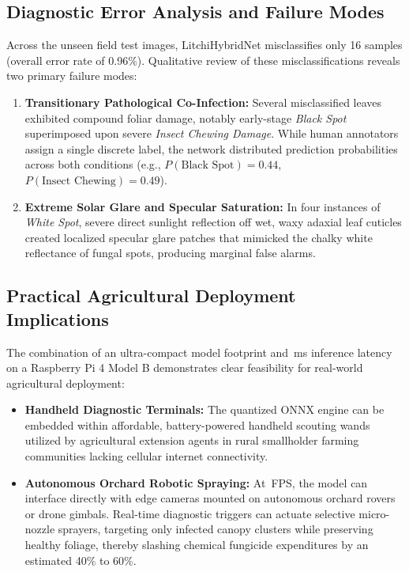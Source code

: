 \subsection{Diagnostic Error Analysis and Failure Modes}
Across the \testEvaluatedSamples{} unseen field test images, LitchiHybridNet misclassifies only 16 samples (overall error rate of 0.96\%). Qualitative review of these misclassifications reveals two primary failure modes:
\begin{enumerate}
    \item \textbf{Transitionary Pathological Co-Infection:} Several misclassified leaves exhibited compound foliar damage, notably early-stage \textit{Black Spot} superimposed upon severe \textit{Insect Chewing Damage}. While human annotators assign a single discrete label, the network distributed prediction probabilities across both conditions (e.g., $P(\text{Black Spot}) = 0.44$, $P(\text{Insect Chewing}) = 0.49$).
    \item \textbf{Extreme Solar Glare and Specular Saturation:} In four instances of \textit{White Spot}, severe direct sunlight reflection off wet, waxy adaxial leaf cuticles created localized specular glare patches that mimicked the chalky white reflectance of fungal spots, producing marginal false alarms.
\end{enumerate}

\subsection{Practical Agricultural Deployment Implications}
The combination of an ultra-compact \modelSizeQuantMB{} model footprint and \rpiLatencyMS{}\,ms inference latency on a Raspberry Pi 4 Model B demonstrates clear feasibility for real-world agricultural deployment:
\begin{itemize}
    \item \textbf{Handheld Diagnostic Terminals:} The quantized ONNX engine can be embedded within affordable, battery-powered handheld scouting wands utilized by agricultural extension agents in rural smallholder farming communities lacking cellular internet connectivity.
    \item \textbf{Autonomous Orchard Robotic Spraying:} At \rpiFPS{}\,FPS, the model can interface directly with edge cameras mounted on autonomous orchard rovers or drone gimbals. Real-time diagnostic triggers can actuate selective micro-nozzle sprayers, targeting only infected canopy clusters while preserving healthy foliage, thereby slashing chemical fungicide expenditures by an estimated 40\% to 60\%.
\end{itemize}

